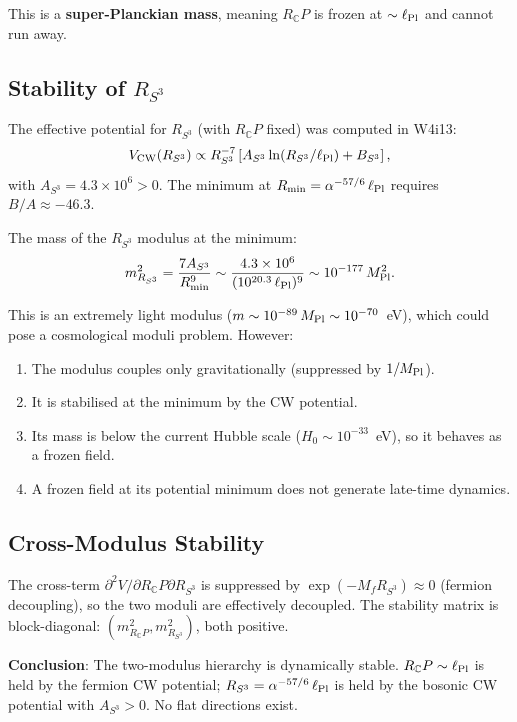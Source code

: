 \documentclass[11pt,a4paper]{article}
\newcounter{findingctr}
\newenvironment{finding}[1][]{%
  \refstepcounter{findingctr}%
  \begin{tcolorbox}[colback=blue!3!white, colframe=blue!50!black,
    title=\textbf{Finding \thefindingctr: #1}]
}{%
  \end{tcolorbox}%
}
\newcommand{\ee}[1]{\times 10^{#1}}
\newcommand{\CP}{\mathbb{C}P}
\newcommand{\Mpl}{M_{\rm Pl}}
\newcommand{\lPl}{\ell_{\rm Pl}}
\newcommand{\alphafine}{\alpha}
\begin{document}
\begin{finding}[\textbf{$\alpha^{57}$}: Hierarchy Is Dynamically Stable]
This is a \textbf{super-Planckian mass}, meaning $R_\CP$ is frozen
at $\sim \lPl$ and cannot run away.

\subsection*{Stability of $R_{S^3}$}

The effective potential for $R_{S^3}$ (with $R_\CP$ fixed) was
computed in W4i13:
\begin{equation}
V_{\rm CW}(R_{S^3}) \propto R_{S^3}^{-7}\left[A_{S^3}\ln(R_{S^3}/\lPl)
+ B_{S^3}\right],
\end{equation}
with $A_{S^3} = 4.3 \times 10^6 > 0$.  The minimum at
$R_{\rm min} = \alphafine^{-57/6}\,\lPl$ requires $B/A \approx -46.3$.

The mass of the $R_{S^3}$ modulus at the minimum:
\begin{equation}
m_{R_{S^3}}^2 = \frac{7 A_{S^3}}{R_{\rm min}^9}
\sim \frac{4.3\ee{6}}{(10^{20.3}\,\lPl)^9}
\sim 10^{-177}\,\Mpl^2.
\end{equation}

This is an extremely light modulus ($m \sim 10^{-89}\,\Mpl
\sim 10^{-70}$~eV), which could pose a cosmological moduli problem.
However:
\begin{enumerate}[nosep]
\item The modulus couples only gravitationally (suppressed by
  $1/\Mpl$).
\item It is stabilised at the minimum by the CW potential.
\item Its mass is below the current Hubble scale
  ($H_0 \sim 10^{-33}$~eV), so it behaves as a frozen field.
\item A frozen field at its potential minimum does not generate
  late-time dynamics.
\end{enumerate}

\subsection*{Cross-Modulus Stability}

The cross-term $\partial^2 V/\partial R_\CP \partial R_{S^3}$ is
suppressed by $\exp(-M_f R_{S^3}) \approx 0$ (fermion decoupling),
so the two moduli are effectively decoupled.  The stability matrix
is block-diagonal: $(m_{R_\CP}^2, m_{R_{S^3}}^2)$, both positive.

\textbf{Conclusion}: The two-modulus hierarchy is dynamically stable.
$R_\CP \sim \lPl$ is held by the fermion CW potential;
$R_{S^3} = \alphafine^{-57/6}\,\lPl$ is held by the bosonic CW
potential with $A_{S^3} > 0$.  No flat directions exist.


\end{finding}
\end{document}

